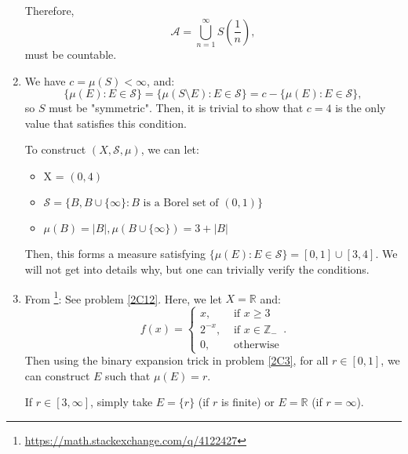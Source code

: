 \begin{enumerate}[label=\textbf{2C.\arabic*}]
  Therefore,
  \[
    \mathcal{A} = \bigcup_{n = 1}^{\infty} S \left( \frac{1}{n} \right) 
  ,\] must be countable.

\item We have \( c = \mu (S) < \infty \), and:
  \[
    \{\mu (E): E \in \mathcal{S}\} = \{\mu (S \setminus E): E \in \mathcal{S}\}
    = c - \{\mu (E): E \in \mathcal{S}\}  
  ,\] so \( S \) must be "symmetric". Then, it is trivial to show that \( c = 4
  \) is the only value that satisfies this condition.

  To construct \( (X, \mathcal{S}, \mu ) \), we can let:
  \begin{itemize}
    \item X = \( (0, 4) \)
    \item \( \mathcal{S} = \{B, B \cup \{\infty\}: B \text{ is a Borel set of }
      (0, 1)\}  \)
    \item \( \mu (B) = |B|, \mu (B \cup \{\infty\}) = 3 + |B|   \)
  \end{itemize}
  Then, this forms a measure satisfying \( \{\mu (E): E \in \mathcal{S}\} = [0,
  1] \cup [3, 4]  \). We will not get into details why, but one can
  trivially verify the conditions.
\item From
  \footnote{\href{https://math.stackexchange.com/q/4122427}{https://math.stackexchange.com/q/4122427}}:
  See problem
  \ref{2C12}. Here, we let \( X = \mathbb{R} \) and:
  \[
    f(x) = \begin{cases}
      x, &\text{ if } x \ge 3\\
      2^{-x}, &\text{ if } x \in \mathbb{Z}_{-}\\
      0, &\text{ otherwise}
    \end{cases}
  .\] 
  Then using the binary expansion trick in problem \ref{2C3}, for all \( r \in
  [0, 1] \), we can construct \( E \) such that \( \mu (E) = r \).

  If \( r \in [3, \infty]   \), simply take \( E = \{r\}   \) (if \( r \) is
  finite) or \( E = \mathbb{R} \) (if \( r = \infty \)).


\end{enumerate}
